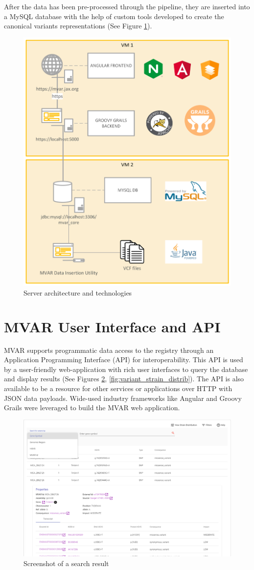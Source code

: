 \documentclass{article}
\begin{document}
After the data has been pre-processed through the pipeline, they are inserted into a MySQL database with the help of custom tools developed to create the canonical variants representations (See Figure \ref{fig:server_architecture}).

\begin{figure}
\centering
\includegraphics[width=0.5\linewidth]{server_architecture.png}
\caption{\label{fig:server_architecture}Server architecture and technologies}
\end{figure}

\section{MVAR User Interface and API}

MVAR supports programmatic data access to the registry through an Application Programming Interface (API) for interoperability. This API is used by a user-friendly web-application with rich user interfaces to query the database and display results (See Figures \ref{fig:search_result}, \ref{fig:variant_strain_distrib}). The API is also available to be a resource for other services or applications over HTTP with JSON data payloads. Wide-used industry frameworks like Angular and Groovy Grails were leveraged to build the MVAR web application.

\begin{figure}
\centering
\includegraphics[width=0.9\linewidth]{search_result_ui.png}
\caption{\label{fig:search_result}Screenshot of a search result}
\end{figure}
\end{document}
